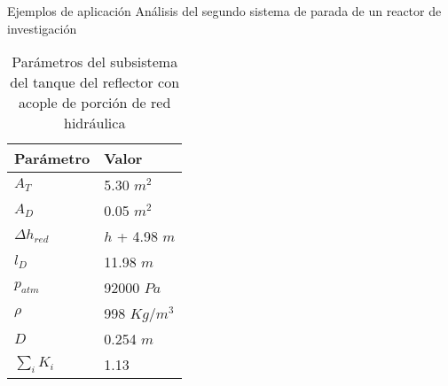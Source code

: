 \normalsize
\begin{frame}
{Ejemplos de aplicación}
{Análisis del segundo sistema de parada de un reactor de investigación}

\begin{table}[]
\centering
\begin{tabular}{|l|l|}
\hline
Parámetro        & Valor          \\ \hline
$A_T$            & 5.30 $m^2$     \\ \hline
$A_D$            & 0.05 $m^2$     \\ \hline
$\Delta h_{red}$ & $h$ + 4.98 $m$ \\ \hline
$l_D$            & 11.98 $m$      \\ \hline
$p_{atm}$        & 92000 $Pa$     \\ \hline
$\rho$           & 998 $Kg/m^3$   \\ \hline
$D$              & 0.254 $m$      \\ \hline
$\sum_i K_i$     & 1.13           \\ \hline
\end{tabular}
\caption{Parámetros del subsistema del tanque del reflector con acople de porción de red hidráulica}
\label{tabla-tanque}
\end{table}

\end{frame}


